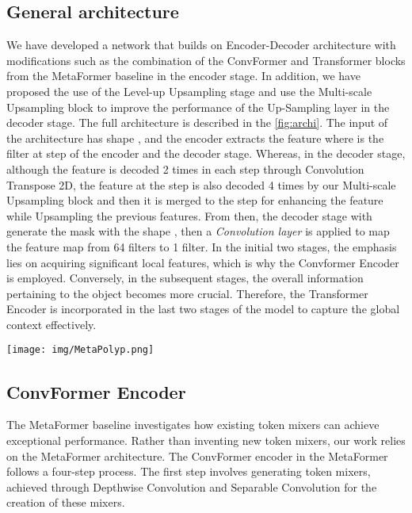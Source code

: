 \documentclass[conference]{IEEEtran}
\begin{document}
\subsection{General architecture}
We have developed a network that builds on Encoder-Decoder architecture with modifications such as the combination of the ConvFormer and Transformer blocks from the MetaFormer baseline in the encoder stage. In addition, we have proposed the use of the Level-up Upsampling stage and use the Multi-scale Upsampling block to improve the performance of the Up-Sampling layer in the decoder stage. The full architecture is described in the \ref{fig:archi}. The input  of the architecture has shape , and the encoder extracts the feature  where  is the filter at step  of the encoder and the decoder stage. Whereas, in the decoder stage, although the feature is decoded 2 times in each step through Convolution Transpose 2D, the feature at the  step is also decoded 4 times by our Multi-scale Upsampling block and then it is merged to the  step for enhancing the feature while Upsampling the previous features. From then, the decoder stage with generate the mask with the shape , then a 
\textit{Convolution layer } is applied to map the feature map from 64 filters to 1 filter. In the initial two stages, the emphasis lies on acquiring significant local features, which is why the Convformer Encoder is employed. Conversely, in the subsequent stages, the overall information pertaining to the object becomes more crucial. Therefore, the Transformer Encoder is incorporated in the last two stages of the model to capture the global context effectively. 

\begin{figure*}[ht]
    \centering
    \texttt{[image: img/MetaPolyp.png]}
    \caption{General architecture of Polyp MetaFormer block}
    \label{fig:archi}
\end{figure*}

\subsection{ConvFormer Encoder}
The MetaFormer baseline \cite{metaformer} investigates how existing token mixers can achieve exceptional performance. Rather than inventing new token mixers, our work relies on the MetaFormer architecture. The ConvFormer encoder in the MetaFormer follows a four-step process. The first step involves generating token mixers, achieved through Depthwise Convolution and Separable Convolution for the creation of these mixers.
\end{document}
